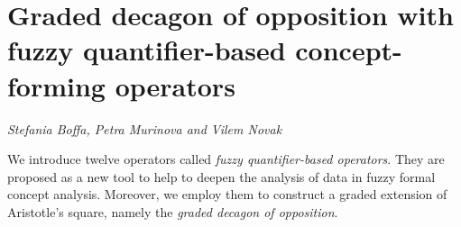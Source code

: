 \documentclass[../booklet.tex]{subfiles}
\begin{document}
\section[Graded decagon of opposition with fuzzy quantifier-based concept-forming operators. {\it Stefania Boffa, Petra Murinova and Vilem Novak}]{Graded decagon of opposition with fuzzy quantifier-based concept-forming operators}
  

\begin{center}
  {\it Stefania Boffa, Petra Murinova and Vilem Novak}
\end{center}

\vskip 0.8cm


We introduce twelve operators called \emph{fuzzy quantifier-based operators}. They are proposed as a new tool to help to deepen the analysis of data in fuzzy formal concept analysis. 
 Moreover, we employ them to construct a graded extension of Aristotle's square, namely the \emph{graded decagon of opposition}.
%
\end{document}
